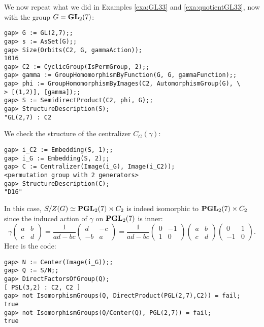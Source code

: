 \begin{example}
    We now repeat what we did in Examples \ref{exa:GL33} and
    \ref{exa:quotientGL33}, now with the group $G=\mathbf{GL}_2(7)$:
\begin{lstlisting}
gap> G := GL(2,7);;
gap> s := AsSet(G);;
gap> Size(Orbits(C2, G, gammaAction));
1016
gap> C2 := CyclicGroup(IsPermGroup, 2);;
gap> gamma := GroupHomomorphismByFunction(G, G, gammaFunction);;
gap> phi := GroupHomomorphismByImages(C2, AutomorphismGroup(G), \ 
> [(1,2)], [gamma]);;
gap> S := SemidirectProduct(C2, phi, G);;
gap> StructureDescription(S);
"GL(2,7) : C2
\end{lstlisting}
We check the structure of the centralizer $C_G(\gamma)$:
\begin{lstlisting}
gap> i_C2 := Embedding(S, 1);;
gap> i_G := Embedding(S, 2);;
gap> C := Centralizer(Image(i_G), Image(i_C2));
<permutation group with 2 generators>
gap> StructureDescription(C);
"D16"
\end{lstlisting}
In this case, $S/Z(G) \simeq \mathbf{PGL}_2(7)\rtimes C_2$ is indeed isomorphic to $\mathbf{PGL}_2(7)\times C_2$ since the induced action of $\gamma$ on $\mathbf{PGL}_2(7)$ is inner:
\[
\gamma\begin{pmatrix}
    a&b\\
    c&d
    \end{pmatrix}
    =\frac{1}{ad-bc}
    \begin{pmatrix}
        d&-c\\
        -b&a
    \end{pmatrix}
    =\frac{1}{ad-bc}
    \begin{pmatrix}
        0&-1\\
        1&0
    \end{pmatrix}
    \begin{pmatrix}
    a&b\\
    c&d
    \end{pmatrix}
    \begin{pmatrix}
        0&1\\
        -1&0
    \end{pmatrix}.
\]
Here is the code:
\begin{lstlisting}
gap> N := Center(Image(i_G));;
gap> Q := S/N;;
gap> DirectFactorsOfGroup(Q);
[ PSL(3,2) : C2, C2 ]
gap> not IsomorphismGroups(Q, DirectProduct(PGL(2,7),C2)) = fail;
true
gap> not IsomorphismGroups(Q/Center(Q), PGL(2,7)) = fail;
true
\end{lstlisting}

\end{example}

